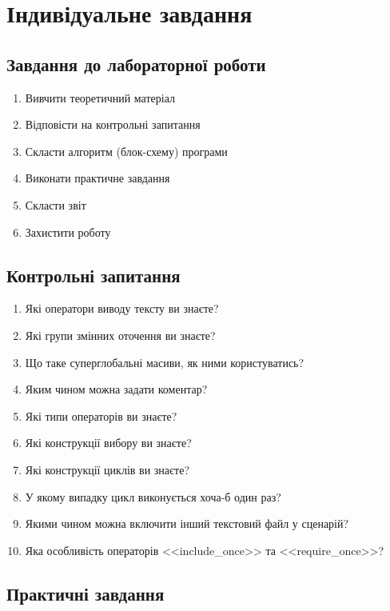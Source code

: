 \pagebreak[3]

\section{Індивідуальне завдання}

\nopagebreak[4]
\subsection*{Завдання до лабораторної роботи}
\nopagebreak[4]
\begin{enumerate}
\item Вивчити теоретичний матеріал
\item Відповісти на контрольні запитання
\item Скласти алгоритм (блок-схему) програми
\item Виконати практичне завдання
\item Скласти звіт
\item Захистити роботу
\end{enumerate}

\subsection*{Контрольні запитання}
\nopagebreak[4]
\begin{enumerate}
\item Які оператори виводу тексту ви знаєте?
\item Які групи змінних оточення ви знаєте?
\item Що таке суперглобальні масиви, як ними користуватись?
\item Яким чином можна задати коментар?
\item Які типи операторів ви знаєте?
\item Які конструкції вибору ви знаєте?
\item Які конструкції циклів ви знаєте?
\item У якому випадку цикл виконується хоча-б один раз?
\item Якими чином можна включити інший текстовий файл у сценарій?
\item Яка особливість операторів <<include\_once>> та <<require\_once>>? 
\end{enumerate}

\subsection*{Практичні завдання}
\nopagebreak[4]



